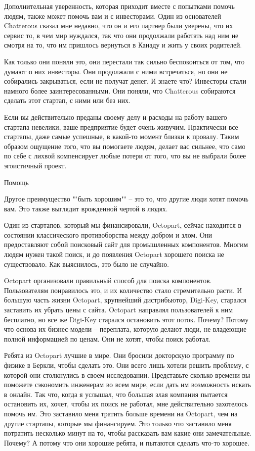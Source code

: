 \documentclass[ebook,12pt,oneside,openany]{memoir}
\begin{document}
Дополнительная уверенность, которая приходит вместе с попытками помочь
людям, также может помочь вам и с инвесторами. Один из основателей
Chatterous сказал мне недавно, что он и его партнер были уверены, что
их сервис то, в чем мир нуждался, так что они продолжали работать над
ним не смотря на то, что им пришлось вернуться в Канаду и жить у своих
родителей.

Как только они поняли это, они перестали так сильно беспокоиться от
том, что думают о них инвесторы. Они продолжали с ними встречаться, но
они не собирались закрываться, если не получат денег. И знаете что?
Инвесторы стали намного более заинтересованными. Они поняли, что
Chatterous собираются сделать этот стартап, с ними или без них.

Если вы действительно преданы своему делу и расходы на работу вашего
стартапа невелики, ваше предприятие будет очень живучим. Практически
все стартапы, даже самые успешные, в какой-то момент близки к провалу.
Таким образом ощущение того, что вы помогаете людям, делает вас
сильнее, что само по себе с лихвой компенсирует любые потери от того,
что вы не выбрали более эгоистичный проект.

Помощь

Другое преимущество ""быть хорошим"" -- это то, что другие люди хотят
помочь вам. Это также выглядит врожденной чертой в людях.

Один из стартапов, который мы финансировали, Octopart, сейчас
находится в состоянии классического противоборства между добром и
злом. Они предоставляют собой поисковый сайт для промышленных
компонентов. Многим людям нужен такой поиск, и до появления Octopart
хорошего поиска не существовало. Как выяснилось, это было не случайно.

Octopart организовали правильный способ для поиска компонентов.
Пользователям понравилось это, и их количество стало стремительно
расти. И большую часть жизни Octopart, крупнейший дистрибьютор,
Digi-Key, старался заставить их убрать цены с сайта. Octopart
направлял пользователей к ним бесплатно, но все же Digi-Key старался
остановить этот поток. Почему? Потому что основа их бизнес-модели --
переплата, которую делают люди, не владеющие полной информацией по
ценам. Они не хотят, чтобы поиск работал.

Ребята из Octopart лучшие в мире. Они бросили докторскую программу по
физике в Беркли, чтобы сделать это. Они всего лишь хотели решить
проблему, с которой они столкнулись в своем исследовании. Представьте
сколько времени вы поможете сэкономить инженерам во всем мире, если
дать им возможность искать в онлайн. Так что, когда я услышал, что
большая злая компания пытается остановить их, хочет, чтобы их поиск не
работал, мне действительно захотелось помочь им. Это заставило меня
тратить больше времени на Octopart, чем на другие стартапы, которые мы
финансируем. Это только что заставило меня потратить несколько минут
на то, чтобы рассказать вам какие они замечательные. Почему? А потому
что они хорошие ребята, и пытаются сделать что-то хорошее.
\end{document}
